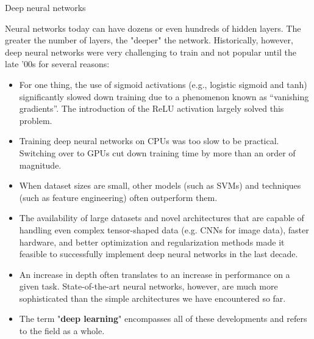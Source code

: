 \begin{vbframe}{Deep neural networks}

Neural networks today can have dozens or even hundreds of hidden layers. The greater the number of layers, the "deeper" the network. Historically, however, deep neural networks were very challenging to train and not popular until the late '00s for several reasons:
\lz
\begin{itemize}
\item For one thing, the use of sigmoid activations (e.g., logistic sigmoid and tanh) significantly slowed down training due to a phenomenon known as \enquote{vanishing gradients}. The introduction of the ReLU activation largely solved this problem.
\item Training deep neural networks on CPUs was too slow to be practical. Switching over to GPUs cut down training time by more than an order of magnitude.
\item When dataset sizes are small, other models (such as SVMs) and techniques (such as feature engineering) often outperform them. 
\end{itemize}
\framebreak
\begin{itemize}
\item The availability of large datasets and novel architectures that are capable of handling even complex tensor-shaped data (e.g. CNNs for image data), faster hardware, and better optimization and regularization methods made it feasible to successfully implement deep neural networks in the last decade.
\lz

\item An increase in depth often translates to an increase in performance on a given task. State-of-the-art neural networks, however, are much more sophisticated than the simple architectures we have encountered so far.

\lz
\item The term "\textbf{deep learning}" encompasses all of these developments and refers to the field as a whole.
\end{itemize}
\end{vbframe}

\endlecture
